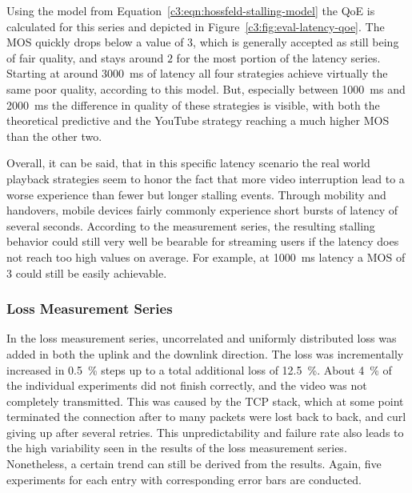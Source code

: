 Using the model from Equation~\ref{c3:eqn:hossfeld-stalling-model} the \gls{QoE} is calculated for this series and depicted in Figure~\ref{c3:fig:eval-latency-qoe}. The \gls{MOS} quickly drops below a value of $3$, which is generally accepted as still being of fair quality, and stays around $2$ for the most portion of the latency series. Starting at around \SI{3000}{\milli\second} of latency all four strategies achieve virtually the same poor quality, according to this model. But, especially between \SI{1000}{\milli\second} and \SI{2000}{\milli\second} the difference in quality of these strategies is visible, with both the theoretical predictive and the YouTube strategy reaching a much higher \gls{MOS} than the other two.

Overall, it can be said, that in this specific latency scenario the real world playback strategies seem to honor the fact that more video interruption lead to a worse experience than fewer but longer stalling events. Through mobility and handovers, mobile devices fairly commonly experience short bursts of latency of several seconds. According to the measurement series, the resulting stalling behavior could still very well be bearable for streaming users if the latency does not reach too high values on average. For example, at \SI{1000}{\milli\second} latency a \gls{MOS} of $3$ could still be easily achievable.


\subsubsection{Loss Measurement Series}

In the loss measurement series, uncorrelated and uniformly distributed loss was added in both the uplink and the downlink direction. The loss was incrementally increased in \SI{0.5}{\percent} steps up to a total additional loss of \SI{12.5}{\percent}. About \SI{4}{\percent} of the individual experiments did not finish correctly, and the video was not completely transmitted. This was caused by the \gls{TCP} stack, which at some point terminated the connection after to many packets were lost back to back, and curl giving up after several retries. This unpredictability and failure rate also leads to the high variability seen in the results of the loss measurement series. Nonetheless, a certain trend can still be derived from the results. Again, five experiments for each entry with corresponding error bars are conducted.


